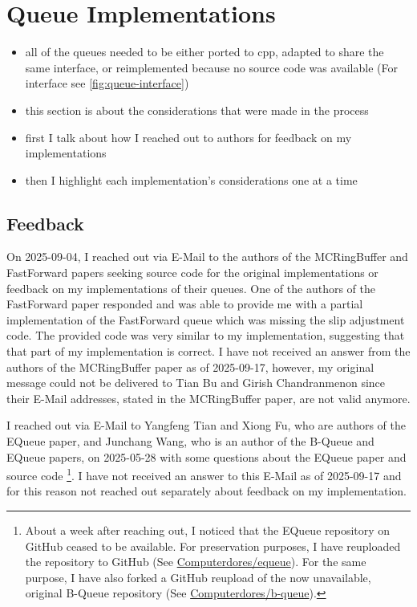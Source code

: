 \section{Queue Implementations}

\begin{itemize}
    \item all of the queues needed to be either ported to cpp, adapted to share the same interface, or
        reimplemented because no source code was available (For interface see \autoref{fig:queue-interface})
    \item this section is about the considerations that were made in the process
    \item first I talk about how I reached out to authors for feedback on my implementations
    \item then I highlight each implementation's considerations one at a time
\end{itemize}

\subsection{Feedback}
On 2025-09-04, I reached out via E-Mail to the authors of the MCRingBuffer and FastForward papers seeking
source code for the original implementations or feedback on my implementations of their queues.
One of the authors of the FastForward paper responded and was able to provide me with a partial
implementation of the FastForward queue which was missing the slip adjustment code.
The provided code was very similar to my implementation, suggesting that that part of my implementation is correct.
I have not received an answer from the authors of the MCRingBuffer paper as of 2025-09-17, however, my
original message could not be delivered to Tian Bu and Girish Chandranmenon since their E-Mail addresses,
stated in the MCRingBuffer paper, are not valid anymore.

I reached out via E-Mail to Yangfeng Tian and Xiong Fu, who are authors of the EQueue paper, and Junchang
Wang, who is an author of the B-Queue and EQueue papers, on 2025-05-28 with some questions about the EQueue
paper and source code
\footnote{About a week after reaching out, I noticed that the EQueue repository on GitHub ceased to be available.
For preservation purposes, I have reuploaded the repository to GitHub (See \href{https://github.com/Computerdores/equeue}{Computerdores/equeue}).
For the same purpose, I have also forked a GitHub reupload of the now unavailable, original B-Queue repository (See \href{https://github.com/Computerdores/b-queue}{Computerdores/b-queue}).}.
I have not received an answer to this E-Mail as of 2025-09-17 and for this reason not reached out separately
about feedback on my implementation.

